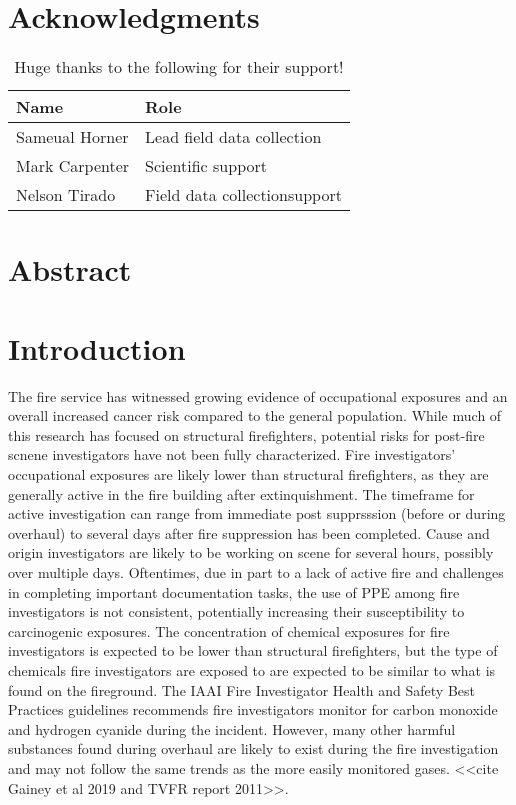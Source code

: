 \documentclass[12pt,oneside]{book}
\begin{document}
\mainmatter

\chapter*{Acknowledgments}

\begin{table}[!ht]
	\centering
	\caption*{Huge thanks to the following for their support!}
	\begin{tabular}{ll}
		\toprule[1.5pt]
		Name & Role \\ 
		\midrule
		Sameual Horner		 & Lead field data collection \\
		Mark Carpenter		 & Scientific support \\
		Nelson Tirado		 & Field data collectionsupport \\
		 
		\bottomrule[1.25pt]
	\end{tabular}
\end{table}

\newpage

\chapter*{Abstract}

\newpage
\chapter{Introduction}
\label{chap:intro}
\setcounter{page}{1}

The fire service has witnessed growing evidence of occupational exposures and an overall increased cancer risk compared to the general population. While much of this research has focused on structural firefighters, potential risks for post-fire scnene investigators have not been fully characterized. Fire investigators’ occupational exposures are likely lower than structural firefighters, as they are generally active in the fire building after extinquishment.  The timeframe for active investigation can range from immediate post supprsssion (before or during overhaul) to several days after fire suppression has been completed. Cause and origin investigators are likely to be working on scene for several hours, possibly over multiple days. Oftentimes, due in part to a lack of active fire and challenges in completing important documentation tasks, the use of PPE among fire investigators is not consistent, potentially increasing their susceptibility to carcinogenic exposures.  The concentration of chemical exposures for fire investigators is expected to be lower than structural firefighters, but the type of chemicals fire investigators are exposed to are expected to be similar to what is found on the fireground. The IAAI Fire Investigator Health and Safety Best Practices guidelines recommends fire investigators monitor for carbon monoxide and hydrogen cyanide during the incident. However, many other harmful substances found during overhaul are likely to exist during the fire investigation and may not follow the same trends as the more easily  monitored gases. <<cite Gainey et al 2019 and TVFR report 2011>>.  
\end{document}
